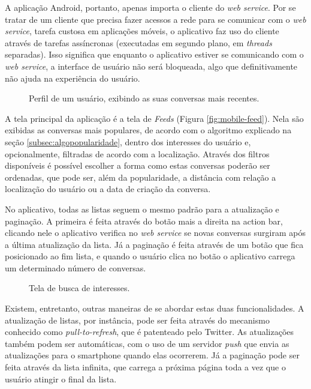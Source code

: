 \documentclass[diss]{template/setrem}
\begin{document}
A aplicação Android, portanto, apenas importa o cliente do \emph{web service}. Por se tratar de um cliente que precisa fazer acessos a rede para se comunicar com o \emph{web service}, tarefa custosa em aplicações móveis, o aplicativo faz uso do cliente através de tarefas assíncronas (executadas em segundo plano, em \emph{threads} separadas). Isso significa que enquanto o aplicativo estiver se comunicando com o \emph{web service}, a interface de usuário não será bloqueada, algo que definitivamente não ajuda na experiência do usuário.

\begin{figure}[!h]
    
    \caption{Perfil de um usuário, exibindo as suas conversas mais recentes.}
    \label{fig:mobile-profile}
\end{figure}

A tela principal da aplicação é a tela de \emph{Feeds} (Figura \ref{fig:mobile-feed}). Nela são exibidas as conversas mais populares, de acordo com o algoritmo explicado na seção \ref{subsec:algopopularidade}, dentro dos interesses do usuário e, opcionalmente, filtradas de acordo com a localização. Através dos filtros disponíveis é possível escolher a forma como estas conversas poderão ser ordenadas, que pode ser, além da popularidade, a distância com relação a localização do usuário ou a data de criação da conversa.

No aplicativo, todas as listas seguem o mesmo padrão para a atualização e paginação. A primeira é feita através do botão mais a direita na action bar, clicando nele o aplicativo verifica no \emph{web service} se novas conversas surgiram após a última atualização da lista. Já a paginação é feita através de um botão que fica posicionado ao fim lista, e quando o usuário clica no botão o aplicativo carrega um determinado número de conversas.

\begin{figure}[!h]
    \caption{Tela de busca de interesses.}
    \label{fig:mobile-explore}
\end{figure}

Existem, entretanto, outras maneiras de se abordar estas duas funcionalidades. A atualização de listas, por instância, pode ser feita através do mecanismo conhecido como \emph{pull-to-refresh}, que é patenteado pelo Twitter. As atualizações também podem ser automáticas, com o uso de um servidor \emph{push} que envia as atualizações para o smartphone quando elas ocorrerem. Já a paginação pode ser feita através da lista infinita, que carrega a próxima página toda a vez que o usuário atingir o final da lista.
\end{document}
